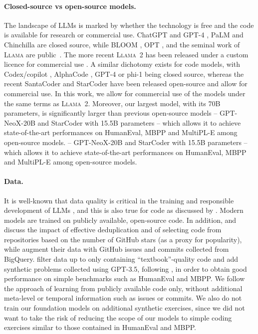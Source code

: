 \paragraph{Closed-source vs open-source models.} The landscape of LLMs is marked by whether the technology is free and the code is available for research or commercial use. ChatGPT and GPT-4 \citep{openai2023gpt4}, PaLM \citep{chowdhery2022palm} and Chinchilla \citep{hoffmann2022training} are closed source, while BLOOM \citep{scao2022bloom}, OPT \citep{zhang2022opt}, and the seminal work of \textsc{Llama} are public~\citep{touvron2023llama}. The more recent \textsc{Llama~2} has been released under a custom licence for commercial use \citep{touvron2023llamav2}. A similar dichotomy exists for code models, with Codex/copilot \citep{chen2021evaluating}, AlphaCode \citep{li2022alphacode}, GPT-4 or phi-1 \citep{gunasekar2023textbooks} being closed source, whereas the recent SantaCoder \citep{allal2023santacoder} and StarCoder \citep{li2023starcoder} have been released open-source and allow for commercial use. In this work, we allow for commercial use of the models under the same terms as \textsc{Llama~2}. 
Moreover, our largest model, with its 70B parameters, is significantly larger than previous open-source models -- GPT-NeoX-20B \citep{black2022gpt} and StarCoder with 15.5B parameters -- which allows it to achieve state-of-the-art performances on HumanEval, MBPP and MultiPL-E among open-source models. -- GPT-NeoX-20B \citep{black2022gpt} and StarCoder with 15.5B parameters -- which allows it to achieve state-of-the-art performances on HumanEval, MBPP and MultiPL-E among open-source models. 

\paragraph{Data.} 
It is well-known that data quality is critical in the training and responsible development of LLMs \citep[e.g.,][]{hoffmann2022training,penedo2023refinedweb}, and this is also true for code as discussed by \citet{allal2023santacoder}. Modern models are trained on publicly available, open-source code. In addition, \citet{allamanis2019adverse} and \citet{allal2023santacoder} discuss the impact of effective deduplication and of selecting code from repositories based on the number of GitHub stars (as a proxy for popularity), while \citet{li2023starcoder} augment their data with GitHub issues and commits collected from BigQuery. \citet{gunasekar2023textbooks} filter data up to only containing ``textbook''-quality code and add synthetic problems collected using GPT-3.5, following \citet{jung2023impossible}, in order to obtain good performance on simple benchmarks such as HumanEval and MBPP. We follow the approach of learning from publicly available code only, without additional meta-level or temporal information such as issues or commits. We also do not train our foundation models on additional synthetic exercises, since we did not want to take the risk of reducing the scope of our models to simple coding exercises similar to those contained in HumanEval and MBPP.

